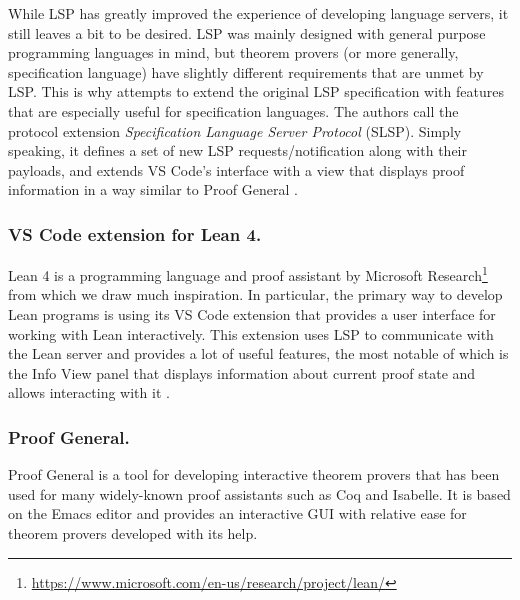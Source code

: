 While LSP has greatly improved the experience of developing language servers,
it still leaves a bit to be desired.
LSP was mainly designed with general purpose programming languages in mind,
but theorem provers (or more generally, specification language) have slightly
different requirements that are unmet by LSP.
This is why \cite{JonasKjaerRask2021} attempts to extend the original LSP
specification with features that are especially useful for specification languages.
The authors call the protocol extension \textit{Specification Language Server Protocol} (SLSP).
Simply speaking, it defines a set of new LSP requests/notification along with
their payloads, and extends VS Code's interface with a view that displays proof
information in a way similar to Proof General \cite{Aspinall2000}.

\subsubsection{VS Code extension for Lean 4.}

Lean 4 \cite{deMouraUllrich2021} is a programming language and proof assistant
by Microsoft Research\footnote{\url{https://www.microsoft.com/en-us/research/project/lean/}}
from which we draw much inspiration.
In particular, the primary way to develop Lean programs is using its VS Code
extension that provides a user interface for working with Lean interactively.
This extension uses LSP to communicate with the Lean server and provides a lot
of useful features, the most notable of which is the Info View panel that
displays information about current proof state and allows interacting with it \cite{Nawrocki2023}.

\subsubsection{Proof General.}

Proof General \cite{Aspinall2000} is a tool for developing interactive theorem
provers that has been used for many widely-known proof assistants such as Coq
and Isabelle.
It is based on the Emacs editor and provides an interactive GUI with relative
ease for theorem provers developed with its help.


